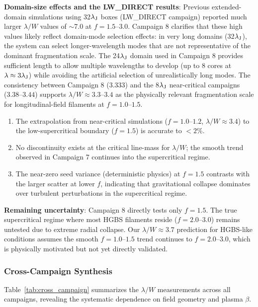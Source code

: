 \documentclass[twoside,twocolumn]{mnras}
\begin{document}
\textbf{Domain-size effects and the LW_DIRECT results}: Previous extended-domain simulations using 32$\lambda_{\rm J}$ boxes (LW_DIRECT campaign) reported much larger $\lambda/W$ values of $\sim$7.0 at $f = 1.5$--$3.0$. Campaign 8 clarifies that these high values likely reflect domain-mode selection effects: in very long domains (32$\lambda_{\rm J}$), the system can select longer-wavelength modes that are not representative of the dominant fragmentation scale. The 24$\lambda_{\rm J}$ domain used in Campaign 8 provides sufficient length to allow multiple wavelengths to develop (up to 8 cores at $\lambda \approx 3\lambda_{\rm J}$) while avoiding the artificial selection of unrealistically long modes. The consistency between Campaign 8 (3.333) and the 8$\lambda_{\rm J}$ near-critical campaigns (3.38--$3.44$) supports $\lambda/W \approx 3.3$--$3.4$ as the physically relevant fragmentation scale for longitudinal-field filaments at $f = 1.0$--$1.5$.
\begin{enumerate}
    \item The extrapolation from near-critical simulations ($f = 1.0$--$1.2$, $\lambda/W \approx 3.4$) to the low-supercritical boundary ($f = 1.5$) is accurate to $<2$\%.
    \item No discontinuity exists at the critical line-mass for $\lambda/W$; the smooth trend observed in Campaign 7 continues into the supercritical regime.
    \item The near-zero seed variance (deterministic physics) at $f = 1.5$ contrasts with the larger scatter at lower $f$, indicating that gravitational collapse dominates over turbulent perturbations in the supercritical regime.
\end{enumerate}

\textbf{Remaining uncertainty}: Campaign 8 directly tests only $f = 1.5$. The true supercritical regime where most HGBS filaments reside ($f = 2.0$--$3.0$) remains untested due to extreme radial collapse. Our $\lambda/W \approx 3.7$ prediction for HGBS-like conditions assumes the smooth $f = 1.0$--$1.5$ trend continues to $f = 2.0$--$3.0$, which is physically motivated but not yet directly validated.

\subsubsection{Cross-Campaign Synthesis}

Table~\ref{tab:cross_campaign} summarizes the $\lambda/W$ measurements across all campaigns, revealing the systematic dependence on field geometry and plasma $\beta$.
\end{document}
